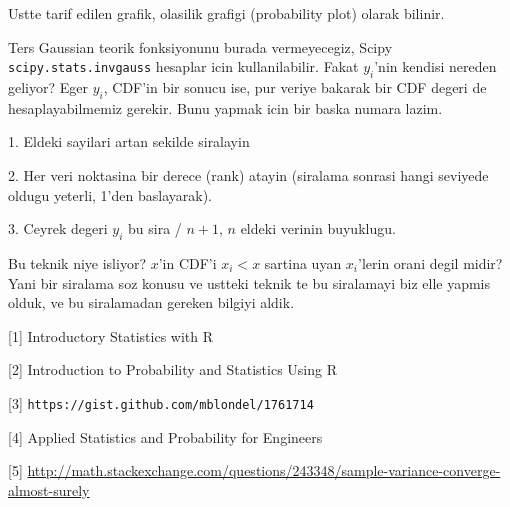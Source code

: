 \documentclass[12pt,fleqn]{article}\usepackage{../common}
\begin{document}
Ustte tarif edilen grafik,  olasilik grafigi (probability plot) olarak
bilinir. 

Ters Gaussian teorik fonksiyonunu burada vermeyecegiz, Scipy
\verb!scipy.stats.invgauss! hesaplar icin kullanilabilir. Fakat $y_i$'nin
kendisi nereden geliyor? Eger $y_i$, CDF'in bir sonucu ise, pur veriye
bakarak bir CDF degeri de hesaplayabilmemiz gerekir. Bunu yapmak icin bir
baska numara lazim. 

1. Eldeki sayilari artan sekilde siralayin

2. Her veri noktasina bir derece (rank) atayin (siralama sonrasi hangi
seviyede oldugu yeterli, 1'den baslayarak). 

3. Ceyrek degeri $y_i$ bu sira / $n+1$, $n$ eldeki verinin buyuklugu. 

Bu teknik niye isliyor? $x$'in CDF'i $x_i < x$ sartina uyan $x_i$'lerin
orani degil midir? Yani bir siralama soz konusu ve ustteki teknik te bu
siralamayi biz elle yapmis olduk, ve bu siralamadan gereken bilgiyi aldik. 


[1] Introductory Statistics with R

[2] Introduction to Probability and Statistics Using R

[3] \verb!https://gist.github.com/mblondel/1761714!

[4] Applied Statistics and Probability for Engineers

[5] \url{http://math.stackexchange.com/questions/243348/sample-variance-converge-almost-surely}
\end{document}
